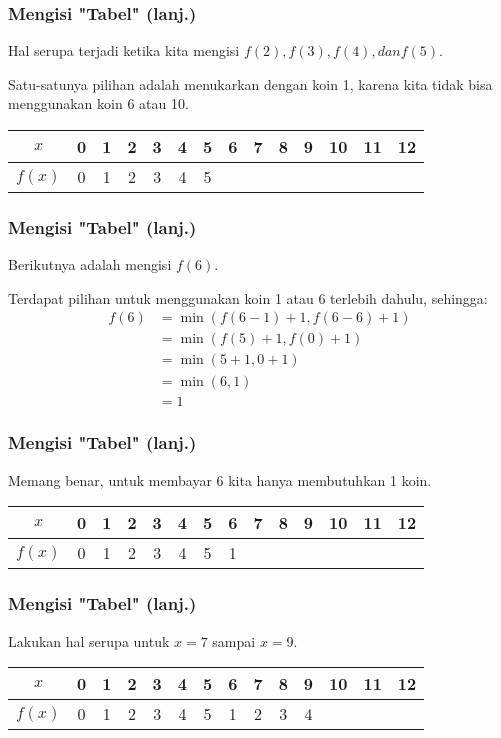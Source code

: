 \begin{frame}
\frametitle{Mengisi "Tabel" (lanj.)}
Hal serupa terjadi ketika kita mengisi $f(2), f(3), f(4), dan f(5)$.

Satu-satunya pilihan adalah menukarkan dengan koin 1, karena kita tidak bisa menggunakan koin 6 atau 10.\newline

\begin{tabular}{|c|c|c|c|c|c|c|c|c|c|c|c|c|c|}
\hline $x$ & 0 & 1 & 2 & 3 & 4 & 5 & 6 & 7 & 8 & 9 & 10 & 11 & 12 \\ 
\hline $f(x)$ &  0 & 1 & 2 & 3 & 4 & 5 &  &  &  &  & & & \\ 
\hline 
\end{tabular} 
\end{frame}

\begin{frame}
\frametitle{Mengisi "Tabel" (lanj.)}
Berikutnya adalah mengisi $f(6)$.

Terdapat pilihan untuk menggunakan koin 1 atau 6 terlebih dahulu, sehingga:
\begin{align*}
  f(6) &= \min(f(6-1) + 1, f(6-6) + 1) \\
  &= \min(f(5) + 1, f(0) + 1) \\
  &= \min(5 + 1, 0 + 1) \\
  &= \min(6, 1) \\
  &= 1
\end{align*}
\end{frame}

\begin{frame}
\frametitle{Mengisi "Tabel" (lanj.)}
Memang benar, untuk membayar 6 kita hanya membutuhkan 1 koin.\newline

\begin{tabular}{|c|c|c|c|c|c|c|c|c|c|c|c|c|c|}
\hline $x$ & 0 & 1 & 2 & 3 & 4 & 5 & 6 & 7 & 8 & 9 & 10 & 11 & 12 \\ 
\hline $f(x)$ &  0 & 1 & 2 & 3 & 4 & 5 & 1 &  &  &  & & & \\ 
\hline 
\end{tabular} 
\end{frame}

\begin{frame}
\frametitle{Mengisi "Tabel" (lanj.)}
Lakukan hal serupa untuk $x = 7$ sampai $x = 9$.\newline

\begin{tabular}{|c|c|c|c|c|c|c|c|c|c|c|c|c|c|}
\hline $x$ & 0 & 1 & 2 & 3 & 4 & 5 & 6 & 7 & 8 & 9 & 10 & 11 & 12 \\ 
\hline $f(x)$ &  0 & 1 & 2 & 3 & 4 & 5 & 1 & 2 & 3 & 4 & & & \\ 
\hline 
\end{tabular} 
\end{frame}

